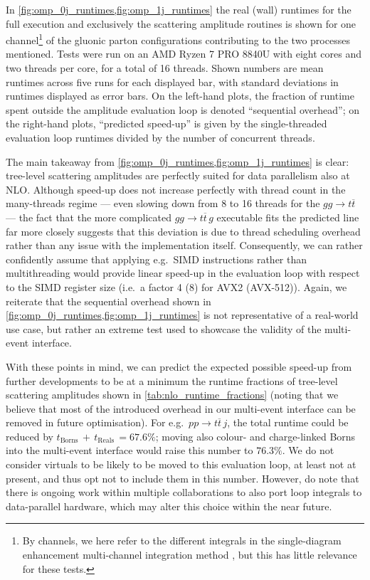\documentclass[a4paper,11pt]{article}
\begin{document}
In \cref{fig:omp_0j_runtimes,fig:omp_1j_runtimes} the real (wall) runtimes for the full execution and exclusively the scattering amplitude routines is shown for one channel\footnote{By channels, we here refer to the different integrals in the single-diagram enhancement multi-channel integration method \cite{Maltoni:2002qb}, but this has little relevance for these tests.} of the gluonic parton configurations contributing to the two processes mentioned. Tests were run on an AMD Ryzen 7 PRO 8840U with eight cores and two threads per core, for a total of 16 threads. Shown numbers are mean runtimes across five runs for each displayed bar, with standard deviations in runtimes displayed as error bars. On the left-hand plots, the fraction of runtime spent outside the amplitude evaluation loop is denoted ``sequential overhead''; on the right-hand plots, ``predicted speed-up'' is given by the single-threaded evaluation loop runtimes divided by the number of concurrent threads.

The main takeaway from \cref{fig:omp_0j_runtimes,fig:omp_1j_runtimes} is clear: tree-level scattering amplitudes are perfectly suited for data parallelism also at NLO. Although speed-up does not increase perfectly with thread count in the many-threads regime --- even slowing down from 8 to 16 threads for the $g g \to t \overline{t}$ --- the fact that the more complicated $g g \to t \overline{t} \, g$ executable fits the predicted line far more closely suggests that this deviation is due to thread scheduling overhead rather than any issue with the implementation itself. Consequently, we can rather confidently assume that applying e.g.\ SIMD instructions rather than multithreading would provide linear speed-up in the evaluation loop with respect to the SIMD register size (i.e.\ a factor 4 (8) for AVX2 (AVX-512)). Again, we reiterate that the sequential overhead shown in \cref{fig:omp_0j_runtimes,fig:omp_1j_runtimes} is not representative of a real-world use case, but rather an extreme test used to showcase the validity of the multi-event interface.

With these points in mind, we can predict the expected possible speed-up from further developments to be at a minimum the runtime fractions of tree-level scattering amplitudes shown in \cref{tab:nlo_runtime_fractions} (noting that we believe that most of the introduced overhead in our multi-event interface can be removed in future optimisation). For e.g.\ $pp \to t \overline{t} \,j$, the total runtime could be reduced by $t_{\text{Borns}} \,+\, t_{\text{Reals}} \, = 67.6\%$; moving also colour- and charge-linked Borns into the multi-event interface would raise this number to $76.3\%$. We do not consider virtuals to be likely to be moved to this evaluation loop, at least not at present, and thus opt not to include them in this number. However, do note that there is ongoing work within multiple collaborations to also port loop integrals to data-parallel hardware, which may alter this choice within the near future.
\end{document}
